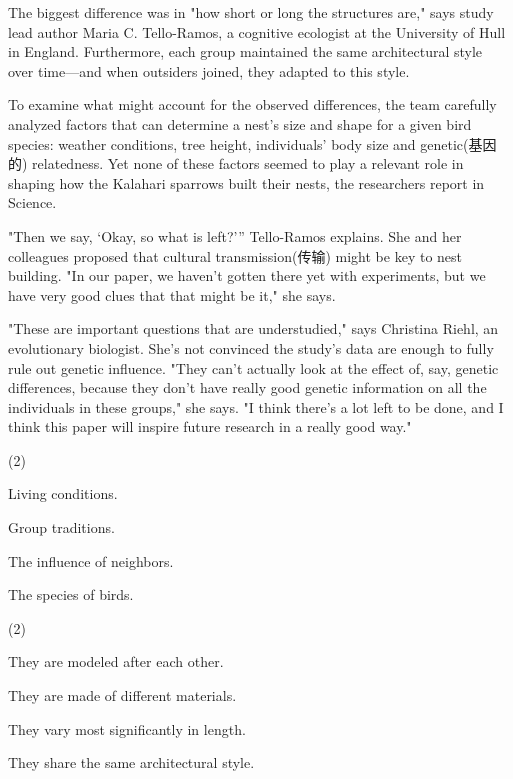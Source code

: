 \documentclass{英语试卷}
\begin{document}
\par The biggest difference was in "how short or long the structures are," says study lead author Maria C. Tello-Ramos, a cognitive ecologist at the University of Hull in England. Furthermore, each group maintained the same architectural style over time—and when outsiders joined, they adapted to this style.\par
\par To examine what might account for the observed differences, the team carefully analyzed factors that can determine a nest's size and shape for a given bird species: weather conditions, tree height, individuals' body size and genetic(基因的) relatedness. Yet none of these factors seemed to play a relevant role in shaping how the Kalahari sparrows built their nests, the researchers report in Science.\par
\par "Then we say, ‘Okay, so what is left?’” Tello-Ramos explains. She and her colleagues proposed that cultural transmission(传输) might be key to nest building. "In our paper, we haven’t gotten there yet with experiments, but we have very good clues that that might be it," she says.\par
\par "These are important questions that are understudied," says Christina Riehl, an evolutionary biologist. She's not convinced the study's data are enough to fully rule out genetic influence. "They can't actually look at the effect of, say, genetic differences, because they don't have really good genetic information on all the individuals in these groups," she says. "I think there's a lot left to be done, and I think this paper will inspire future research in a really good way."\par
{}
\begin{choices}(2)
  \item Living conditions.
  \item Group traditions.
  \item The influence of neighbors.
  \item The species of birds.
\end{choices}
\begin{choices}(2)
  \item They are modeled after each other.
  \item They are made of different materials.
  \item They vary most significantly in length.
  \item They share the same architectural style.
\end{choices}
\end{document}
